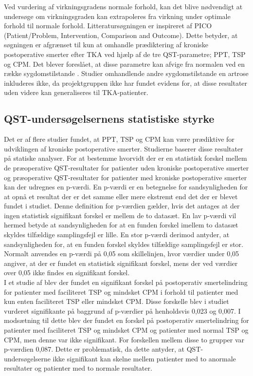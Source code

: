  Ved vurdering af virkningsgradens normale forhold, kan det blive nødvendigt at undersøge om virkningsgraden kan extrapoleres fra virkning under optimale forhold til normale forhold. Litteratursøgningen er inspireret af PICO (Patient/Problem, Intervention, Comparison and Outcome). Dette betyder, at søgningen er afgrænset til kun at omhandle prædiktering af kroniske postoperative smerter efter TKA ved hjælp af de tre QST-parametre; PPT, TSP og CPM. Det blever foreslået, at disse parametre kan afvige fra normalen ved en række sygdomstilstande \citep{Petersen2016}. Studier omhandlende andre sygdomstilstande en artrose inkluderes ikke, da projektgruppen ikke har fundet evidens for, at disse resultater uden videre kan generaliseres til TKA-patienter. 

\subsection{QST-undersøgelsernens statistiske styrke}
Det er af flere studier fundet, at PPT, TSP og CPM kan være prædiktive for udviklingen af kroniske postoperative smerter. \citep{Wylde2016} \citep{Petersen2016} Studierne baserer disse resultater på statiske analyser. For at bestemme hvorvidt der er en statistisk forskel mellem de præoperative QST-resultater for patienter uden kroniske postoperative smerter og præoperative QST-resultater for patienter med kroniske postoperative smerter kan der udregnes en p-værdi. En p-værdi er en betegnelse for sandsynligheden for at opnå et resultat der er det samme eller mere ekstremt end det der er blevet fundet i studiet. Denne definition for p-værdien gælder, hvis det antages at der ingen statistisk signifikant forskel er mellem de to datasæt. En lav p-værdi vil hermed betyde at sandsynligheden for at en funden forskel imellem to datasæt skyldes tilfældige samplingsfejl er lille. En stor p-værdi derimod antyder, at sandsynligheden for, at en funden forskel skyldes tilfældige samplingsfejl er stor. Normalt anvendes en p-værdi på 0,05 som skillelinjen, hvor værdier under 0,05 angiver, at der er fundet en statistisk signifikant forskel, mens der ved værdier over 0,05 ikke findes en signifikant forskel. \citep{Zar2010} \\
I et studie af   blev der fundet en signifikant forskel på postoperativ smertelindring for patienter med faciliteret TSP og mindsket CPM i forhold til patienter med kun enten faciliteret TSP eller mindsket CPM. Disse forskelle blev i studiet vurderet signifikante på baggrund af p-værdier på henholdsvis 0,023 og 0,007. I modsætning til dette blev der fundet en forskel på postoperativ smertelindring for patienter med faciliteret TSP og mindsket CPM og patienter med normal TSP og CPM, men denne var ikke signifikant. For forskellen mellem disse to grupper var p-værdien 0,087. \citep{Petersen2016} Dette er problematisk, da dette antyder, at QST-undersøgelserne ikke signifikant kan skelne mellem patienter med to anormale resultater og patienter med to normale resultater. \\
